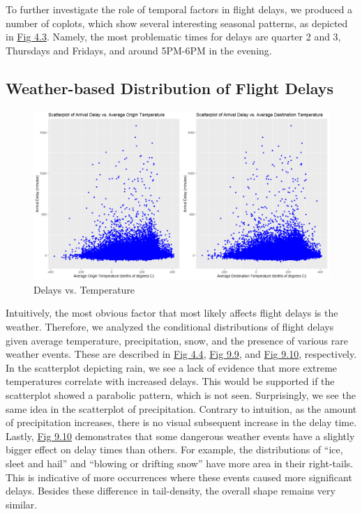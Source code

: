 \documentclass[12pt, a4paper, openany]{book}
\newcommand\tab[1][1cm]{\hspace*{#1}}
\begin{document}
	
		
	To further investigate the role of temporal factors in flight delays, we produced a number of coplots, which show several interesting seasonal patterns, as depicted in \underline{Fig 4.3}. Namely, the most problematic times for delays are quarter 2 and 3, Thursdays and Fridays, and around 5PM-6PM in the evening.\\	 
		\subsection{Weather-based Distribution of Flight Delays}
			\begin{figure}[h]
			\centering
	 		\includegraphics[width = .9 \textwidth]{../figures/PLOTS FOR REPORT/Chapter 4/Figure 4.41}
	 		\caption{Delays vs. Temperature}
	 		\end{figure}

	\tab Intuitively, the most obvious factor that most likely affects flight delays is the weather. Therefore, we analyzed the conditional distributions of flight delays given average temperature, precipitation, snow, and the presence of various rare weather events. These are described in \underline{Fig 4.4}, \underline{Fig 9.9}, and \underline{Fig 9.10}, respectively. In the scatterplot depicting rain, we see a lack of evidence that more extreme temperatures correlate with increased delays. This would be supported if the scatterplot showed a parabolic pattern, which is not seen. Surprisingly, we see the same idea in the scatterplot of precipitation. Contrary to intuition, as the amount of precipitation increases, there is no visual subsequent increase in the delay time. Lastly, \underline{Fig 9.10} demonstrates that some dangerous weather events have a slightly bigger effect on delay times than others. For example, the distributions of “ice, sleet and hail” and “blowing or drifting snow” have more area in their right-tails. This is indicative of more occurrences where these events caused more significant delays. Besides these difference in tail-density, the overall shape remains very similar. \\
\end{document}
